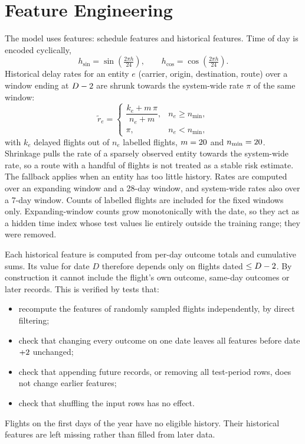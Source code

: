 \documentclass[conference]{IEEEtran}
\begin{document}
\section{Feature Engineering}\label{sec:features}
The model uses \NFeatures{} features: \NSchedFeatures{} schedule features and \NHistFeatures{}
historical features. Time of day is encoded cyclically,
\begin{equation}
h_{\sin} = \sin\!\left(\tfrac{2\pi h}{24}\right), \qquad h_{\cos} = \cos\!\left(\tfrac{2\pi h}{24}\right).
\end{equation}
Historical delay rates for an entity $e$ (carrier, origin, destination, route) over a window ending
at $D-2$ are shrunk towards the system-wide rate $\pi$ of the same window:
\begin{equation}
\tilde{r}_e =
\begin{cases}
\dfrac{k_e + m\,\pi}{n_e + m}, & n_e \geq n_{\min},\\[4pt]
\pi, & n_e < n_{\min},
\end{cases}
\end{equation}
with $k_e$ delayed flights out of $n_e$ labelled flights, $m=20$ and $n_{\min}=20$.
Shrinkage pulls the rate of a sparsely observed entity towards the system-wide rate, so a route
with a handful of flights is not treated as a stable risk estimate. The fallback applies
when an entity has too little history. Rates are computed over an expanding window and a 28-day
window, and system-wide rates also over a 7-day window. Counts of labelled flights are included for
the fixed windows only. Expanding-window counts grow monotonically with the date, so they act as a
hidden time index whose test values lie entirely outside the training range; they were removed.

Each historical feature is computed from per-day outcome totals and cumulative sums. Its value for
date $D$ therefore depends only on flights dated $\leq D-2$. By construction it cannot
include the flight's own outcome, same-day outcomes or later records. This is verified by tests
that:
\begin{itemize}
\item recompute the features of randomly sampled flights independently, by direct filtering;
\item check that changing every outcome on one date leaves all features before date $+2$
unchanged;
\item check that appending future records, or removing all test-period rows, does not change
earlier features;
\item check that shuffling the input rows has no effect.
\end{itemize}
Flights on the first \HistLag{} days of the year have no eligible history. Their historical
features are left missing rather than filled from later data.
\end{document}
